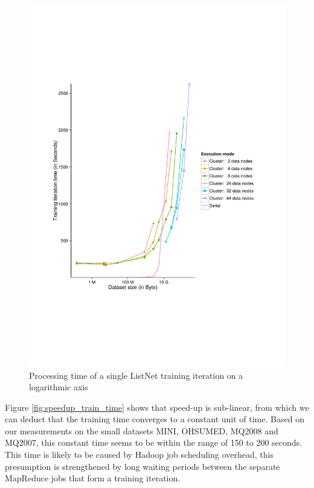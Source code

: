 \begin{figure}
\centering
\includegraphics[trim=0cm 5cm 0cm 5cm, scale=0.8]{gfx/time_single_logx.pdf}
\caption{Processing time of a single ListNet training iteration on a logarithmic axis}
\label{fig:listnet_train_time_log}
\end{figure}

Figure \ref{fig:speedup_train_time} shows that speed-up is sub-linear, from which we can deduct that the training time converges to a constant unit of time. Based on our measurements on the small datasets MINI, OHSUMED, MQ2008 and MQ2007, this constant time seems to be within the range of 150 to 200 seconds. This time is likely to be caused by Hadoop job scheduling overhead, this presumption is strengthened by long waiting periods between the separate MapReduce jobs that form a training iteration.\\

